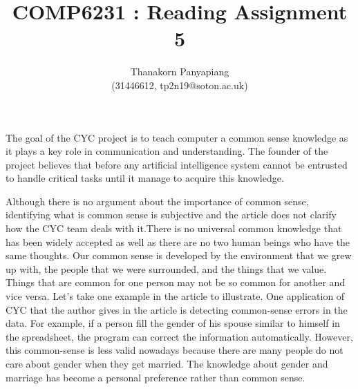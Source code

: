 \documentclass{article}
\title{COMP6231 : Reading Assignment 5}
\author{Thanakorn Panyapiang\\
(31446612, tp2n19@soton.ac.uk)}
\date{}
\begin{document}
\maketitle

The goal of the CYC project is to teach computer a common sense knowledge as it plays a key role in communication and understanding. The founder of the project believes that before any artificial intelligence system cannot be entrusted to handle critical tasks until it manage to acquire this knowledge. 

\indent Although there is no argument about the importance of common sense, identifying what is common sense is subjective and the article does not clarify how the CYC team deals with it.There is no universal common knowledge that has been widely accepted as well as there are no two human beings who have the same thoughts. Our common sense is developed by the environment that we grew up with, the people that we were surrounded, and the things that we value. Things that are common for one person may not be so common for another and vice versa. Let's take one example in the article to illustrate. One application of CYC that the author gives in the article is detecting common-sense errors in the data. For example, if a person fill the gender of his spouse similar to himself in the spreadsheet, the program can correct the information automatically. However, this common-sense is less valid nowadays because there are many people do not care about gender when they get married. The knowledge about gender and marriage has become a personal preference rather than common sense.
\end{document}
